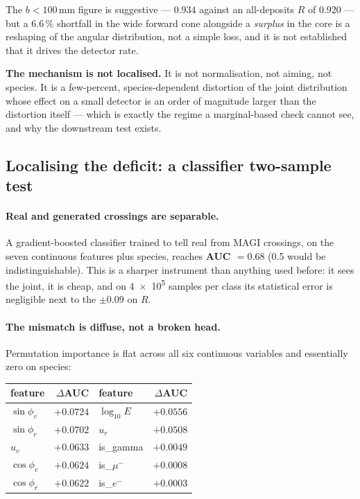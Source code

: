 \documentclass[11pt,a4paper]{article}
\begin{document}
The $b<100$\,mm figure is suggestive --- $0.934$ against an all-deposits $R$ of
$0.920$ --- but a $6.6\,\%$ shortfall in the wide forward cone alongside a
\emph{surplus} in the core is a reshaping of the angular distribution, not a
simple loss, and it is not established that it drives the detector rate.

\textbf{The mechanism is not localised.} It is not normalisation, not aiming, not
species. It is a few-percent, species-dependent distortion of the joint
distribution whose effect on a small detector is an order of magnitude larger
than the distortion itself --- which is exactly the regime a marginal-based check
cannot see, and why the downstream test exists.


\subsection{Localising the deficit: a classifier two-sample test}
\label{sec:classifier}

\paragraph{Real and generated crossings are separable.} A gradient-boosted
classifier trained to tell real from MAGI crossings, on the seven continuous
features plus species, reaches \textbf{AUC $= 0.68$} (0.5 would be
indistinguishable). This is a sharper instrument than anything used before: it
sees the joint, it is cheap, and on \num{4e5} samples per class its statistical
error is negligible next to the $\pm0.09$ on $R$.

\paragraph{The mismatch is diffuse, not a broken head.} Permutation importance is
flat across all six continuous variables and essentially zero on species:

\begin{center}
\begin{tabular}{lrlr}
\toprule
feature & $\Delta$AUC & feature & $\Delta$AUC \\
\midrule
$\sin\phi_v$ & $+0.0724$ & $\log_{10}E$ & $+0.0556$ \\
$\sin\phi_r$ & $+0.0702$ & $u_r$        & $+0.0508$ \\
$u_v$        & $+0.0633$ & is\_gamma    & $+0.0049$ \\
$\cos\phi_v$ & $+0.0624$ & is\_$\mu^-$  & $+0.0008$ \\
$\cos\phi_r$ & $+0.0622$ & is\_$e^-$    & $+0.0003$ \\
\bottomrule
\end{tabular}
\end{center}
\end{document}

